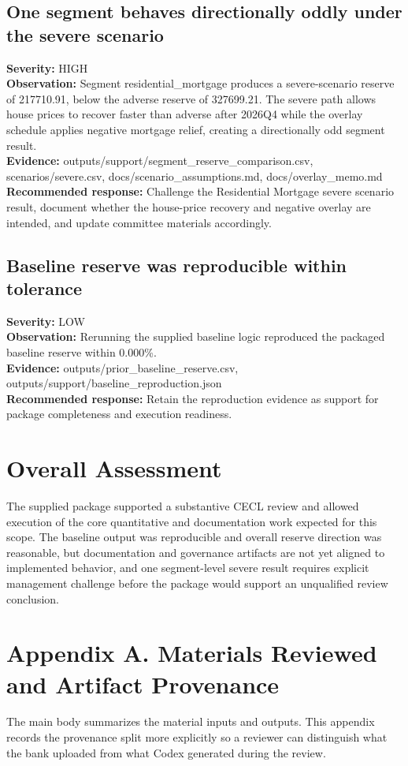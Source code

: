 \documentclass[11pt]{article}
\begin{document}
\subsection*{One segment behaves directionally oddly under the severe scenario}
\textbf{Severity:} HIGH\\
\textbf{Observation:} Segment residential\_mortgage produces a severe-scenario reserve of 217710.91, below the adverse reserve of 327699.21. The severe path allows house prices to recover faster than adverse after 2026Q4 while the overlay schedule applies negative mortgage relief, creating a directionally odd segment result.\\
\textbf{Evidence:} outputs/support/segment\_reserve\_comparison.csv, scenarios/severe.csv, docs/scenario\_assumptions.md, docs/overlay\_memo.md\\
\textbf{Recommended response:} Challenge the Residential Mortgage severe scenario result, document whether the house-price recovery and negative overlay are intended, and update committee materials accordingly.
\subsection*{Baseline reserve was reproducible within tolerance}
\textbf{Severity:} LOW\\
\textbf{Observation:} Rerunning the supplied baseline logic reproduced the packaged baseline reserve within 0.000\%.\\
\textbf{Evidence:} outputs/prior\_baseline\_reserve.csv, outputs/support/baseline\_reproduction.json\\
\textbf{Recommended response:} Retain the reproduction evidence as support for package completeness and execution readiness.
\section*{Overall Assessment}
The supplied package supported a substantive CECL review and allowed execution of the core quantitative and documentation work expected for this scope. The baseline output was reproducible and overall reserve direction was reasonable, but documentation and governance artifacts are not yet aligned to implemented behavior, and one segment-level severe result requires explicit management challenge before the package would support an unqualified review conclusion.
\section*{Appendix A. Materials Reviewed and Artifact Provenance}
The main body summarizes the material inputs and outputs. This appendix records the provenance split more explicitly so a reviewer can distinguish what the bank uploaded from what Codex generated during the review.
\end{document}
